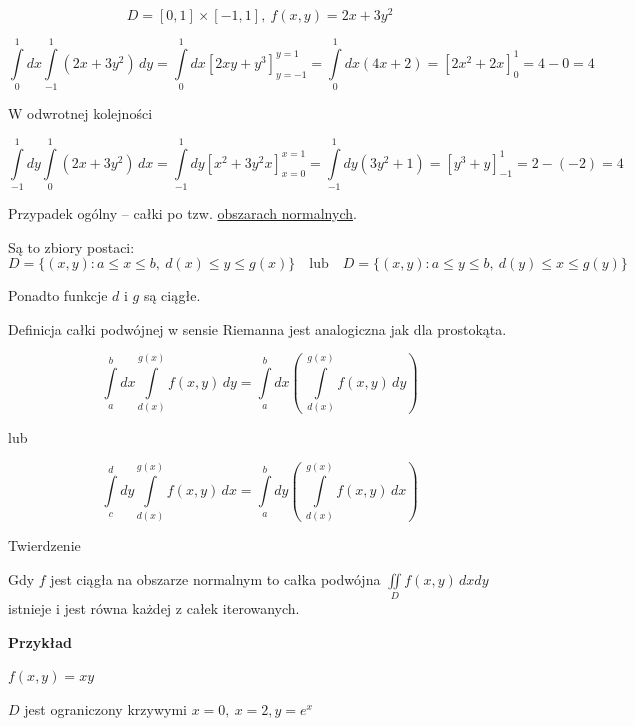 \[ D = [0,1] \times [-1,1], \ f(x,y) = 2x + 3y^2 \]

\[ \int\limits_{0}^{1} dx \int\limits_{-1}^{1} (2x+3y^2) \, dy = \int\limits_{0}^{1} dx \left[ 2xy + y^3 \right]_{y = -1}^{y=1} 
= \int\limits_{0}^{1} dx (4x+2) = \left[ 2x^2 + 2x \right]_0^1 = 4 - 0 = 4 \]

\begin{center} W odwrotnej kolejności \end{center}
\[ \int\limits_{-1}^{1} dy \int\limits_{0}^{1} (2x+3y^2)\, dx = \int\limits_{-1}^{1} dy \left[ x^2 + 3y^2x \right]_{x=0}^{x=1} 
= \int\limits_{-1}^{1} dy (3y^2 + 1) = \left[ y^3 + y \right]_{-1}^{1} = 2- (-2) = 4 \]

Przypadek ogólny -- całki po tzw. \underline{obszarach normalnych}.

Są to zbiory postaci:
\[ D = \{ (x,y): a \leq x \leq b, \ d(x) \leq y \leq g(x) \} \quad \textrm{lub} \quad D = \{ (x,y): a \leq y \leq b, \ d(y) \leq x \leq g(y) \} \]

Ponadto funkcje $d$ i $g$ są ciągłe.
\bigskip

Definicja całki podwójnej w sensie Riemanna jest analogiczna jak dla prostokąta.

\[ \int\limits_{a}^{b} dx \int\limits_{d(x)}^{g(x)} f(x,y)\, dy = \int\limits_{a}^{b} dx \left( \ \int\limits_{d(x)}^{g(x)} f(x,y)\, dy \right) \]
\begin{center} lub \end{center}
\[ \int\limits_{c}^{d} dy \int\limits_{d(x)}^{g(x)} f(x,y)\, dx = \int\limits_{a}^{b} dy \left( \ \int\limits_{d(x)}^{g(x)} f(x,y)\, dx \right) \]

\begin{tw}{Twierdzenie}

Gdy $f$ jest ciągła na obszarze normalnym to całka podwójna $ \iint\limits_{D} f(x,y)\, dxdy $ istnieje i jest równa każdej z całek iterowanych. 

\end{tw}

\textbf{Przykład}

$ f(x,y) = xy $

$D$ jest ograniczony krzywymi $ x=0, \ x=2, y=e^x $
\medskip

